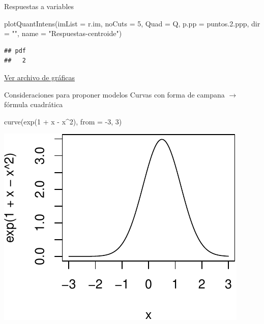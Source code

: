 \documentclass[
  11pt,
  ignorenonframetext,
]{beamer}
\newenvironment{Shaded}{}{}
\newcommand{\AttributeTok}[1]{\textcolor[rgb]{0.49,0.56,0.16}{#1}}
\newcommand{\DecValTok}[1]{\textcolor[rgb]{0.25,0.63,0.44}{#1}}
\newcommand{\FloatTok}[1]{\textcolor[rgb]{0.25,0.63,0.44}{#1}}
\newcommand{\FunctionTok}[1]{\textcolor[rgb]{0.02,0.16,0.49}{#1}}
\newcommand{\NormalTok}[1]{#1}
\newcommand{\SpecialCharTok}[1]{\textcolor[rgb]{0.25,0.44,0.63}{#1}}
\newcommand{\StringTok}[1]{\textcolor[rgb]{0.25,0.44,0.63}{#1}}
\begin{document}
\begin{frame}[fragile]{Respuestas a variables}
\protect\hypertarget{respuestas-a-variables}{}
\begin{Shaded}
\begin{Highlighting}[]
\FunctionTok{plotQuantIntens}\NormalTok{(}\AttributeTok{imList =}\NormalTok{ r.im,}
                \AttributeTok{noCuts =} \DecValTok{5}\NormalTok{,}
                \AttributeTok{Quad =}\NormalTok{ Q,}
                \AttributeTok{p.pp =}\NormalTok{ puntos.}\FloatTok{2.}\NormalTok{ppp,}
                \AttributeTok{dir =} \StringTok{""}\NormalTok{,}
                \AttributeTok{name =} \StringTok{"Respuestas{-}centroide"}\NormalTok{)}
\end{Highlighting}
\end{Shaded}

\begin{verbatim}
## pdf 
##   2
\end{verbatim}

\href{Respuestas-centroide.pdf}{Ver archivo de gráficas}
\end{frame}

\begin{frame}[fragile]{Consideraciones para proponer modelos}
\protect\hypertarget{consideraciones-para-proponer-modelos}{}
Curvas con forma de campana \(\rightarrow\) fórmula cuadrática

\begin{Shaded}
\begin{Highlighting}[]
\FunctionTok{curve}\NormalTok{(}\FunctionTok{exp}\NormalTok{(}\DecValTok{1} \SpecialCharTok{+}\NormalTok{ x }\SpecialCharTok{{-}}\NormalTok{ x}\SpecialCharTok{\^{}}\DecValTok{2}\NormalTok{), }\AttributeTok{from =} \SpecialCharTok{{-}}\DecValTok{3}\NormalTok{, }\DecValTok{3}\NormalTok{)}
\end{Highlighting}
\end{Shaded}

\includegraphics{Tutorial-spatstat-2_files/figure-beamer/unnamed-chunk-12-1.pdf}
\end{frame}
\end{document}
